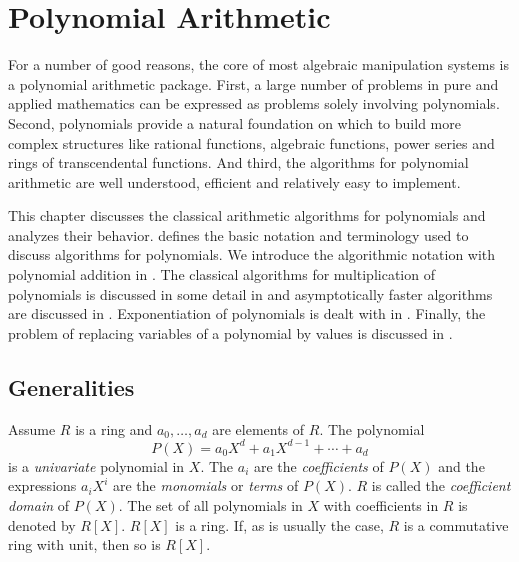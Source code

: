 \chapter{Polynomial Arithmetic}
\label{Poly:Arith:Chap}

For a number of good reasons, the core of most algebraic manipulation
systems is a polynomial arithmetic package.  First, a large number of
problems in pure and applied mathematics can be expressed as problems
solely involving polynomials.  Second, polynomials provide a natural
foundation on which to build more complex structures like rational
functions, algebraic functions, power series and rings of
transcendental functions.  And third, the algorithms for polynomial
arithmetic are well understood, efficient and relatively easy to
implement.

This chapter discusses the classical arithmetic algorithms for
polynomials and analyzes their behavior.
 defines the basic notation and 
terminology used to discuss algorithms for polynomials.  We introduce
the algorithmic notation with polynomial addition in
.  The classical algorithms for multiplication
of polynomials is discussed in some detail in 
and asymptotically faster algorithms are discussed in
.  Exponentiation of polynomials is dealt with
in .  Finally, the problem of replacing
variables of a polynomial by values is discussed in .

\section{Generalities}
\label{Poly:Generalities:Sec}

Assume $R$ is a ring and $a_{0}, \ldots, a_{d}$ are elements of $R$.
The polynomial
\[
P(X) = a_{0}X^{d}+ a_{1}X^{d-1} + \cdots + a_{d}
\]
is a {\em univariate} polynomial in $X$. The
$a_{i}$ are the {\em coefficients} of $P(X)$ and the expressions $a_{i}
X^{i}$ are the {\em monomials} or {\em terms} of $P(X)$. $R$ is called the {\em coefficient
domain} of $P(X)$. The set of
all polynomials in $X$ with coefficients in $R$ is denoted by $R[X]$.
$R[X]$ is a ring. If, as is usually the case, $R$ is a commutative
ring with unit, then so is $R[X]$.


